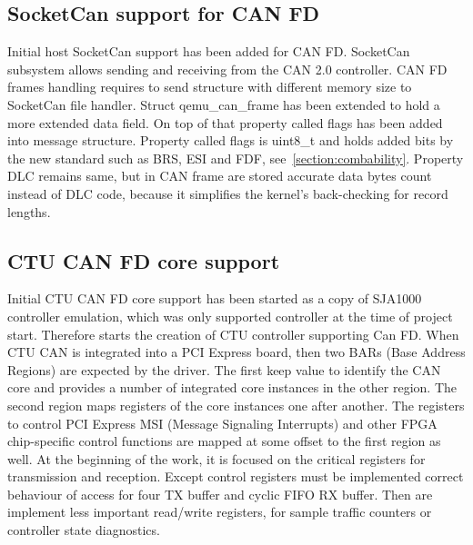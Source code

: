 \documentclass{ctuthesis}
\begin{document}
 \subsection{SocketCan support for CAN FD}
  Initial host SocketCan support has been added for CAN FD. SocketCan subsystem allows sending and receiving from the CAN 2.0 controller. CAN FD frames handling requires to send structure with different memory size to SocketCan file handler. Struct qemu\_can\_frame has been extended to hold a more extended data field. On top of that property called flags has been added into message structure. Property called flags is uint8\_t and holds added bits by the new standard such as BRS, ESI and FDF, see~\ref{section:combability}. Property DLC remains same, but in CAN frame are stored accurate data bytes count instead of DLC code, because it simplifies the kernel's back-checking for record lengths.

 \subsection{CTU CAN FD core support}
  Initial CTU CAN FD core support has been started as a copy of SJA1000 controller emulation, which was only supported controller at the time of project start. Therefore starts the creation of CTU controller supporting Can FD.
  When CTU CAN is integrated into a PCI Express board, then two BARs (Base Address Regions) are expected by the driver. The first keep value to identify the CAN core and provides a number of integrated core instances in the other region. The second region maps registers of the core instances one after another. The registers to control PCI Express MSI (Message Signaling Interrupts) and other FPGA chip-specific control functions are mapped at some offset to the first region as well. At the beginning of the work, it is focused on the critical registers for transmission and reception. Except control registers must be implemented correct behaviour of access for four TX buffer and cyclic FIFO RX buffer. Then are implement less important read/write registers, for sample traffic counters or controller state diagnostics.
 
\end{document}

